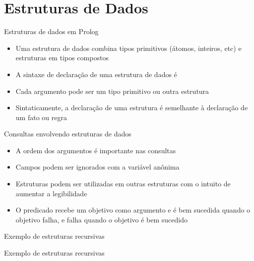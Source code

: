 \section{Estruturas de Dados}

\begin{frame}[fragile]{Estruturas de dados em Prolog}

    \begin{itemize}
        \item Uma estrutura de dados combina tipos primitivos (átomos, inteiros, etc) e 
            estruturas em tipos compostos

        \item A sintaxe de declaração de uma estrutura de dados é 


        \item Cada argumento pode ser um tipo primitivo ou outra estrutura

        \item Sintaticamente, a declaração de uma estrutura é semelhante à declaração de um 
            fato ou regra


   \end{itemize}

\end{frame}

\begin{frame}[fragile]{Consultas envolvendo estruturas de dados}

    \begin{itemize}
        \item A ordem dos argumentos é importante nas consultas


        \item Campos podem ser ignorados com a variável anônima

        \item Estruturas podem ser utilizadas em outras estruturas com o intuito de aumentar a 
            legibilidade


        \item O predicado  recebe um objetivo como argumento e é bem 
            sucedida quando o objetivo falha, e falha quando o objetivo é bem sucedido

    \end{itemize}

\end{frame}

\begin{frame}[fragile]{Exemplo de estruturas recursivas}


\end{frame}

\begin{frame}[fragile]{Exemplo de estruturas recursivas}


\end{frame}

